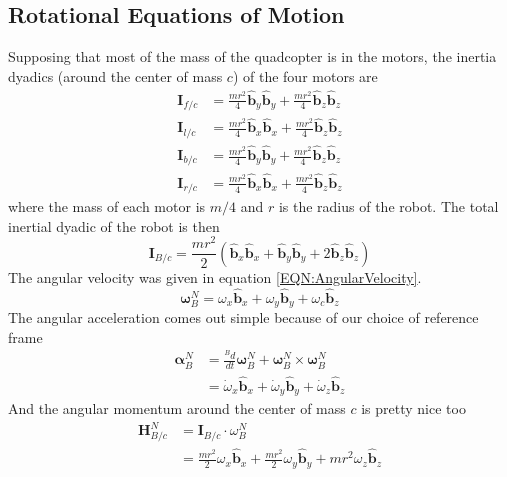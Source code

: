 \documentclass[lettersize,journal]{IEEEtran}
\begin{document}
\subsection{Rotational Equations of Motion}
Supposing that most of the mass of the quadcopter is in the motors, the inertia dyadics (around the center of mass $c$) of the four motors are
\begin{align}
  \mathbf{I}_{f/c} &= \frac{mr^2}{4} \mathbf{\hat{b}}_y\mathbf{\hat{b}}_y + \frac{mr^2}{4} \mathbf{\hat{b}}_z \mathbf{\hat{b}}_z \\
  \mathbf{I}_{l/c} &= \frac{mr^2}{4} \mathbf{\hat{b}}_x\mathbf{\hat{b}}_x + \frac{mr^2}{4} \mathbf{\hat{b}}_z \mathbf{\hat{b}}_z \\
  \mathbf{I}_{b/c} &= \frac{mr^2}{4} \mathbf{\hat{b}}_y\mathbf{\hat{b}}_y + \frac{mr^2}{4} \mathbf{\hat{b}}_z \mathbf{\hat{b}}_z \\
  \mathbf{I}_{r/c} &= \frac{mr^2}{4} \mathbf{\hat{b}}_x\mathbf{\hat{b}}_x + \frac{mr^2}{4} \mathbf{\hat{b}}_z \mathbf{\hat{b}}_z
\end{align}
where the mass of each motor is $m/4$ and $r$ is the radius of the robot.
The total inertial dyadic of the robot is then
\begin{equation}
  \mathbf{I}_{B/c} = \frac{mr^2}{2} \left(\mathbf{\hat{b}}_x\mathbf{\hat{b}}_x + \mathbf{\hat{b}}_y\mathbf{\hat{b}}_y + 2 \mathbf{\hat{b}}_z\mathbf{\hat{b}}_z\right)
\end{equation}
The angular velocity was given in equation \ref{EQN:AngularVelocity}.
\begin{equation}
  {\boldsymbol\omega^N_B} = \omega_x\mathbf{\hat{b}}_x + \omega_y\mathbf{\hat{b}}_y + \omega_c \mathbf{\hat{b}}_z \nonumber
\end{equation}
The angular acceleration comes out simple because of our choice of reference frame
\begin{align}
  \boldsymbol\alpha^N_B &= \frac{^B d}{dt} \boldsymbol\omega^N_B +\boldsymbol\omega_B^N\times\boldsymbol\omega_B^N\nonumber\\
	&= \dot\omega_x \mathbf{\hat{b}}_x + \dot\omega_y \mathbf{\hat{b}}_y + \dot\omega_z \mathbf{\hat{b}}_z
\end{align}
And the angular momentum around the center of mass $c$ is pretty nice too
\begin{align}
  {\mathbf{H}^N_{B/c}}
	&= \mathbf{I}_{B/c} \cdot \omega_B^N\nonumber \\
	&= \frac{mr^2}{2}\omega_x\mathbf{\hat{b}}_x + \frac{mr^2}{2}\omega_y\mathbf{\hat{b}}_y + mr^2\omega_z \mathbf{\hat{b}}_z
\end{align}
\end{document}
